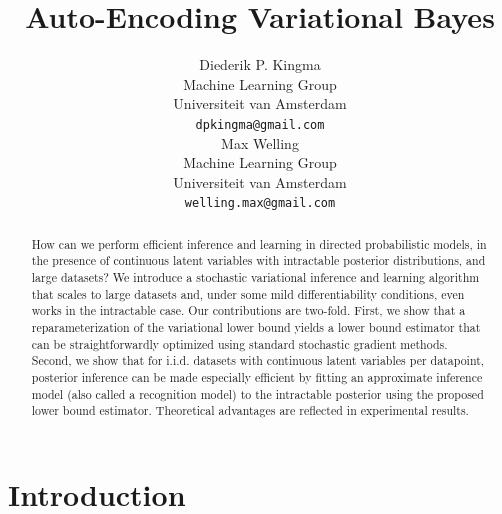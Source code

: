 \documentclass{article} %
\title{Auto-Encoding Variational Bayes}
\author{
Diederik P. Kingma \\
Machine Learning Group \\
Universiteit van Amsterdam \\
\texttt{dpkingma@gmail.com} \\
\And
Max Welling \\
Machine Learning Group \\
Universiteit van Amsterdam \\
\texttt{welling.max@gmail.com} \\
}
\theoremstyle{definition}
\begin{document}
\maketitle

\begin{abstract}
How can we perform efficient inference and learning in directed probabilistic models, in the presence of continuous latent variables with intractable posterior distributions, and large datasets?
We introduce a stochastic variational inference and learning algorithm that scales to large datasets and, under some mild differentiability conditions, even works in the intractable case. Our contributions are two-fold.
First, we show that a reparameterization of the variational lower bound yields a lower bound estimator that can be straightforwardly optimized using standard stochastic gradient methods.
Second, we show that for i.i.d. datasets with continuous latent variables per datapoint, posterior inference can be made especially efficient by fitting an approximate inference model (also called a recognition model) to the intractable posterior using the proposed lower bound estimator. 
Theoretical advantages are reflected in experimental results.
\end{abstract}

\section{Introduction}
\end{document}
